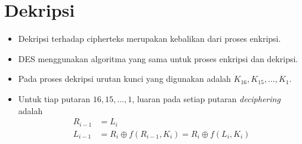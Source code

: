 \documentclass{article}
\begin{document}

\section*{Dekripsi}

\begin{itemize}
    \item Dekripsi terhadap cipherteks merupakan kebalikan dari proses enkripsi.
    \item DES menggunakan algoritma yang sama untuk proses enkripsi dan dekripsi.
    \item Pada proses dekripsi urutan kunci yang digunakan adalah $K_{16}, K_{15}, \dots, K_1$.
    \item Untuk tiap putaran $16, 15, \dots, 1$, luaran pada setiap putaran \textit{deciphering} adalah
    \[
    \begin{aligned}
    R_{i-1} &= L_i \\
    L_{i-1} &= R_i \oplus f(R_{i-1}, K_i) = R_i \oplus f(L_i, K_i)
    \end{aligned}
    \]
\end{itemize}
\end{document}
